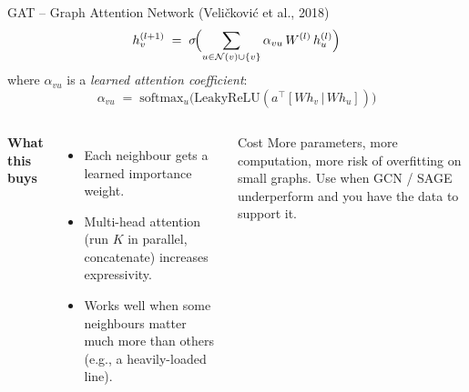 \documentclass[aspectratio=169,10pt]{beamer}
\begin{document}
\begin{frame}{GAT -- Graph Attention Network (Veli\v{c}kovi\'c et al., 2018)}
\begin{equation*}
h_v^{(l+1)} \;=\; \sigma\!\Bigl( \sum_{u \in \mathcal{N}(v) \cup \{v\}} \alpha_{vu} \, W^{(l)} \, h_u^{(l)} \Bigr)
\end{equation*}
where $\alpha_{vu}$ is a \emph{learned attention coefficient}:
\begin{equation*}
\alpha_{vu} \;=\; \text{softmax}_u \bigl( \text{LeakyReLU}( a^\top [W h_v \,|\, W h_u]) \bigr)
\end{equation*}
\vspace{0.3em}
\begin{columns}[T]
\textbf{What this buys}
\begin{itemize}
  \item Each neighbour gets a learned importance weight.
  \item Multi-head attention (run $K$ in parallel, concatenate) increases expressivity.
  \item Works well when some neighbours matter much more than others (e.g., a heavily-loaded line).
\end{itemize}
\begin{block}{Cost}
More parameters, more computation, more risk of overfitting on small graphs. Use when GCN / SAGE underperform and you have the data to support it.
\end{block}
\end{columns}
\end{frame}
\end{document}
